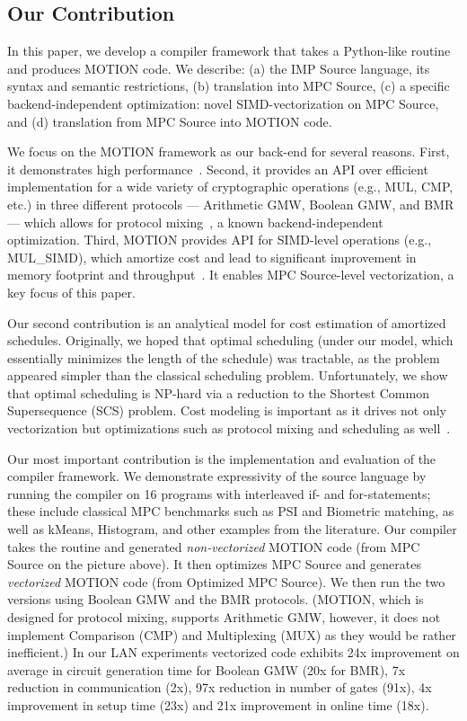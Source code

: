 \subsection{Our Contribution} In this paper, we develop a compiler framework that takes a Python-like routine and produces MOTION code. We describe: (a) the IMP Source language, its syntax and semantic restrictions, (b) translation into MPC Source, (c) a specific backend-independent optimization: novel SIMD-vectorization on MPC Source, and (d) translation from MPC Source into MOTION code. %

We focus on the MOTION framework as our back-end for several reasons. First, it demonstrates high performance~\cite{Braun:2022}. Second, it provides an API over efficient implementation for a wide variety of cryptographic operations (e.g., MUL, CMP, etc.) in three different protocols ---  Arithmetic GMW, Boolean GMW, and BMR --- which allows for protocol mixing~\cite{Buscher:2018b,Ishaq:2019, Fang:2022}, a known backend-independent optimization. Third, MOTION provides API for SIMD-level operations (e.g., MUL\_SIMD), which amortize cost and lead to significant improvement in memory footprint and throughput~\cite{Demmler:2015, Araki:2018, Braun:2022}. It enables MPC Source-level vectorization, a key focus of this paper.

Our second contribution is an analytical model for cost estimation of amortized schedules. Originally, we hoped that optimal scheduling (under our model, which essentially minimizes the length of the schedule) was tractable, as the problem appeared simpler than the classical scheduling problem. Unfortunately, we show that optimal scheduling is NP-hard via a reduction to the Shortest Common Supersequence (SCS) problem. Cost modeling is important as it drives not only vectorization but optimizations such as protocol mixing and scheduling as well~\cite{Buscher:2018b,Ishaq:2019, Fang:2022}.

Our most important contribution is the implementation and evaluation of the compiler framework. We demonstrate expressivity of the source language by running the compiler on 16 programs with interleaved if- and for-statements; these include classical MPC benchmarks such as PSI and Biometric matching, as well as kMeans, Histogram, and other examples from the literature. 
Our compiler takes the routine and generated \emph{non-vectorized} MOTION code (from MPC Source on the picture above). It then optimizes MPC Source and generates 
\emph{vectorized} MOTION code (from Optimized MPC Source). We then run the two versions using Boolean GMW and the BMR protocols. (MOTION, which is designed for 
protocol mixing, supports Arithmetic GMW, however, it does not implement Comparison (CMP) and Multiplexing (MUX) as they would be rather inefficient.)
In our LAN experiments vectorized code exhibits 24x improvement on average in circuit generation time for Boolean GMW (20x for BMR), 7x reduction 
in communication (2x), 97x reduction in number of gates (91x), 4x improvement in setup time (23x) and 21x improvement in online time (18x).

